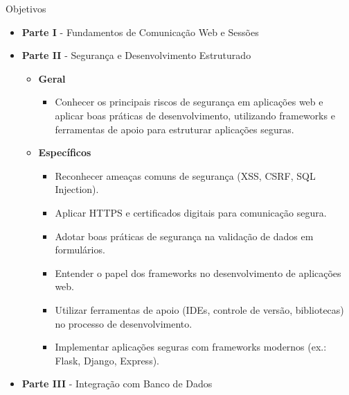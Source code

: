 \documentclass{beamer}
\begin{document}
\begin{frame}{Objetivos}
    \begin{itemize}
        \justifying
        \item \textbf{Parte I} - Fundamentos de Comunicação Web e Sessões
        \item \textbf{Parte II} - Segurança e Desenvolvimento Estruturado
            \begin{itemize}
                \item \textbf{Geral}
                    \begin{itemize}
                        \justifying
                        \scriptsize
                        \item Conhecer os principais riscos de segurança em aplicações web e aplicar boas práticas de desenvolvimento, utilizando frameworks e ferramentas de apoio para estruturar aplicações seguras.
                    \end{itemize}
                \item \textbf{Específicos}
                    \begin{itemize}
                        \justifying
                        \scriptsize
                        \item Reconhecer ameaças comuns de segurança (XSS, CSRF, SQL Injection).
                        \item Aplicar HTTPS e certificados digitais para comunicação segura.
                        \item Adotar boas práticas de segurança na validação de dados em formulários.
                        \item Entender o papel dos frameworks no desenvolvimento de aplicações web.
                        \item Utilizar ferramentas de apoio (IDEs, controle de versão, bibliotecas) no processo de desenvolvimento.
                        \item Implementar aplicações seguras com frameworks modernos (ex.: Flask, Django, Express).
                    \end{itemize}
            \end{itemize}
        \item \textbf{Parte III} - Integração com Banco de Dados
    \end{itemize}
\end{frame}
\end{document}
